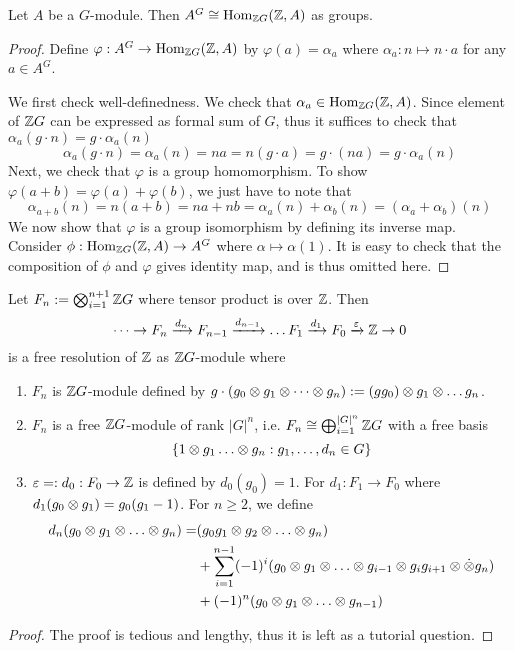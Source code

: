 \begin{lem}
    Let $A$ be a $G$-module. Then $A^G \cong \operatorname{Hom}_{{\mathbb Z} G}({\mathbb Z},A)$ as groups.
\end{lem}
\begin{proof}
    Define $\varphi: A^G \to \operatorname{Hom}_{{\mathbb Z} G}({\mathbb Z}, A)$ by $\varphi(a)= \alpha_a$ where $\alpha_a: n \mapsto n\cdot a$ for any $a\in A^G$.

    We first check well-definedness. We check that $\alpha_a \in \operatorname{Hom}_{{\mathbb Z} G}({\mathbb Z},A)$. Since element of ${\mathbb Z} G$ can be expressed as formal sum of $G$, thus it suffices to check that $\alpha_a(g\cdot n) = g\cdot \alpha_a(n)$ 
    \[\alpha_a(g\cdot n) = \alpha_a(n) = na = n(g \cdot a) = g\cdot (na) = g\cdot \alpha_a(n)\]
    Next, we check that $\varphi$ is a group homomorphism. To show $\varphi(a+b)= \varphi(a) + \varphi(b)$, we just have to note that 
    \[\alpha_{a+b}(n) = n(a+b) = na + nb = \alpha_a(n) + \alpha_b(n) = (\alpha_a + \alpha_b)(n)\]
    We now show that $\varphi$ is a group isomorphism by defining its inverse map. Consider $\phi:\operatorname{Hom}_{{\mathbb Z} G}({\mathbb Z}, A) \to A^G$ where $\alpha\mapsto \alpha(1)$. It is easy to check that the composition of $\phi$ and $\varphi$ gives identity map, and is thus omitted here.
\end{proof}

\begin{pro}
    Let $F_n := \bigotimes_{i=1}^{n+1} {\mathbb Z} G$ where tensor product is over ${\mathbb Z}$. Then
    \[\dots \to F_n \xrightarrow{d_n} F_{n-1} \xrightarrow{d_{n-1}} \dots F_1 \xrightarrow{d_1} F_0 \xrightarrow{\varepsilon} {\mathbb Z} \to 0\]
    is a free resolution of ${\mathbb Z}$ as ${\mathbb Z} G$-module where
    \begin{enumerate}
        \item $F_n$ is ${\mathbb Z} G$-module defined by $g\cdot (g_0 \otimes g_1 \otimes \dots \otimes g_n) := (gg_0) \otimes g_1 \otimes \dots g_n$.
        \item $F_n$ is a free ${\mathbb Z} G$-module of rank $|G|^n$, i.e. $F_n \cong \bigoplus_{i=1}^{|G|^n} {\mathbb Z} G$ with a free basis
        \[\sbr{1\ten g_1 \dots \ten g_n:g_1, \dots, d_n\in G}\]
        \item $\varepsilon =: d_0:F_0 \to {\mathbb Z}$ is defined by $d_0(g_0)=1$. For $d_1:F_1\to F_0$ where $d_1(g_0\otimes g_1)= g_0(g_1-1)$. For $n\geq 2$, we define
        \begin{align*}
            d_n(g_0 \ten g_1 \ten \dots \ten g_n)=
            &(g_0g_1\ten g_2 \ten \dots \ten g_n)\\ 
            &+ \sum_{i=1}^{n-1}(-1)^i(g_0\ten g_1 \ten \dots \ten g_{i-1}\ten g_{i}g_{i+1} \ten \dot \ten g_n)\\ 
            &+ (-1)^n(g_0\ten g_1 \ten \dots \ten g_{n-1})
        \end{align*}
    \end{enumerate}
\end{pro}
\begin{proof}
    The proof is tedious and lengthy, thus it is left as a tutorial question.
\end{proof}

